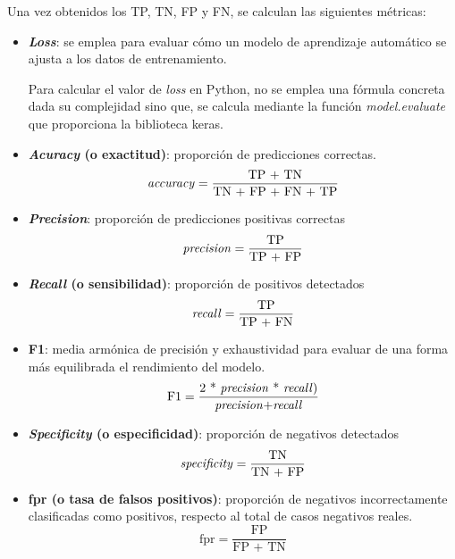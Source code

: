 Una vez obtenidos los TP, TN, FP y FN, se calculan las siguientes métricas:

\begin{itemize}
    \item \textbf{\textit{Loss}}: se emplea para evaluar cómo un modelo de aprendizaje automático se ajusta a los datos de entrenamiento.
    
    Para calcular el valor de \textit{loss} en Python, no se emplea una fórmula concreta dada su complejidad sino que, se calcula mediante la función \textit{model.evaluate} que proporciona la biblioteca keras.
    \item \textbf{\textit{Acuracy} (o exactitud)}: proporción de predicciones correctas. 
    \begin{equation*}
        \text{\textit{accuracy}} = \frac{\text{TP + TN}}{\text{TN + FP + FN + TP}}
    \end{equation*}
    \item \textbf{\textit{Precision}}: proporción de predicciones positivas correctas
    \begin{equation*}
        \text{\textit{precision}} = \frac{\text{TP}}{\text{TP + FP}}
    \end{equation*}
    \item \textbf{\textit{Recall} (o sensibilidad)}: proporción de positivos detectados
    \begin{equation*}
        \text{\textit{recall}} = \frac{\text{TP}}{\text{TP + FN}}
    \end{equation*}
    \item \textbf{F1}:  media armónica de precisión y exhaustividad para evaluar de una forma más equilibrada el rendimiento del modelo.
    \begin{equation*}
        \text{F1} = \frac{\text{2 * \textit{precision} * \textit{recall})}}{\text{\textit{precision}+\textit{recall}}}
    \end{equation*}
    \item \textbf{\textit{Specificity} (o especificidad)}: proporción de negativos detectados
    \begin{equation*}
        \text{\textit{specificity}} = \frac{\text{TN}}{\text{TN + FP}}
    \end{equation*}
    \item \textbf{fpr (o tasa de falsos positivos)}: proporción de negativos incorrectamente clasificadas como positivos, respecto al total de casos negativos reales.
    \begin{equation*}
        \text{fpr} = \frac{\text{FP}}{\text{FP + TN}}

\end{equation*}
\end{itemize}
